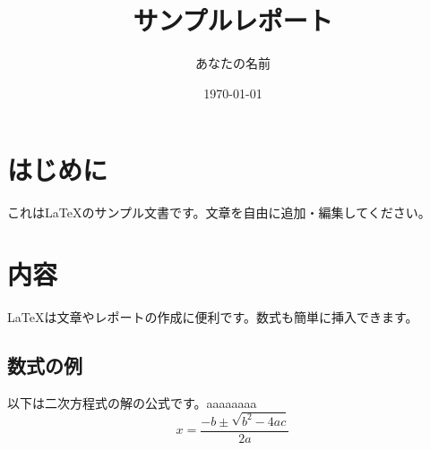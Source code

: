 \documentclass{article}
\title{サンプルレポート}
\author{あなたの名前}
\date{\today}
\begin{document}
\maketitle
\section{はじめに}
これはLaTeXのサンプル文書です。文章を自由に追加・編集してください。
\section{内容}
\LaTeX は文章やレポートの作成に便利です。数式も簡単に挿入できます。
\subsection{数式の例}
以下は二次方程式の解の公式です。aaaaaaaa
\[ x = \frac{-b \pm \sqrt{b^2 - 4ac}}{2a} \]
\end{document}
